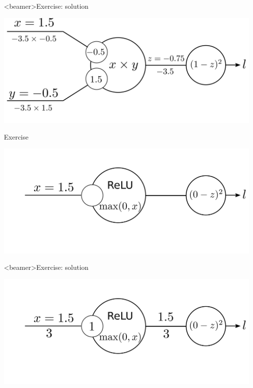 \documentclass[xcolor=pdftex,dvipsnames,table,mathserif]{beamer}
\begin{document}
\begin{frame}<beamer>{Exercise: solution}

  \includegraphics[width=\textwidth]{bp_2_1_neuron_exo_sol.png}

\end{frame}


\begin{frame}{Exercise}

  \includegraphics[width=\textwidth]{bp_relu_exo.png}

\end{frame}

\begin{frame}<beamer>{Exercise: solution}

  \includegraphics[width=\textwidth]{bp_relu_exo_sol.png}

\end{frame}
\end{document}
